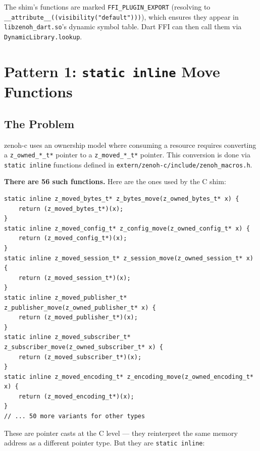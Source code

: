\documentclass[11pt,a4paper]{article}
\newcommand{\code}[1]{\texttt{#1}}
\newcommand{\file}[1]{\texttt{#1}}
\newcommand{\type}[1]{\texttt{#1}}
\begin{document}
The shim's functions are marked \code{FFI\_PLUGIN\_EXPORT}
(resolving to \code{\_\_attribute\_\_((visi\-bi\-li\-ty("default")))}),
which ensures they appear in \code{libzenoh\_dart.so}'s dynamic symbol
table. Dart FFI can then call them via \code{DynamicLibrary.lookup}.


\section{Pattern 1: \code{static inline} Move Functions}
\label{sec:pattern1}

\subsection{The Problem}

zenoh-c uses an ownership model where consuming a resource requires
converting a \type{z\_owned\_\allowbreak{}*\_t*} pointer to a
\type{z\_moved\_\allowbreak{}*\_t*} pointer. This conversion is done via
\code{static inline} functions defined in
\file{extern/\allowbreak{}zenoh-c/\allowbreak{}include/\allowbreak{}zenoh\_macros.h}.

\textbf{There are 56 such functions.} Here are the ones used by the C shim:

\begin{lstlisting}[style=cstyle,caption={Move functions from \file{zenoh\_macros.h} (lines 7--51)}]
static inline z_moved_bytes_t* z_bytes_move(z_owned_bytes_t* x) {
    return (z_moved_bytes_t*)(x);
}
static inline z_moved_config_t* z_config_move(z_owned_config_t* x) {
    return (z_moved_config_t*)(x);
}
static inline z_moved_session_t* z_session_move(z_owned_session_t* x) {
    return (z_moved_session_t*)(x);
}
static inline z_moved_publisher_t* z_publisher_move(z_owned_publisher_t* x) {
    return (z_moved_publisher_t*)(x);
}
static inline z_moved_subscriber_t* z_subscriber_move(z_owned_subscriber_t* x) {
    return (z_moved_subscriber_t*)(x);
}
static inline z_moved_encoding_t* z_encoding_move(z_owned_encoding_t* x) {
    return (z_moved_encoding_t*)(x);
}
// ... 50 more variants for other types
\end{lstlisting}

These are pointer casts at the C level --- they reinterpret the same memory
address as a different pointer type. But they are \code{static inline}:
\end{document}
